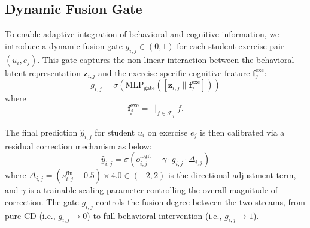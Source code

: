 \documentclass[a4paper,runningheads]{llncs}
\begin{document}
\subsection{Dynamic Fusion Gate}
To enable adaptive integration of behavioral and cognitive information, we introduce a dynamic fusion gate $g_{i,j} \in (0,1)$ for each student-exercise pair $(u_i, e_j)$. This gate captures the non-linear interaction between the behavioral latent representation $\bm{z}_{i,j}$ and the exercise-specific cognitive feature $\bm{f}^{\text{exe}}_j$:
\begin{equation}
    g_{i,j} = \sigma\left(\text{MLP}_{\text{gate}}\left(\left[\bm{z}_{i,j} \parallel \bm{f}^{\text{exe}}_j\right]\right)\right)
\end{equation}
where
\begin{equation}
    \bm{f}^{\text{exe}}_j = \mathop{\parallel}_{f \in \mathcal{F}_j} f.
\end{equation}

The final prediction $\hat{y}_{i,j}$ for student $u_i$ on exercise $e_j$ is then calibrated via a residual correction mechanism as below:
\begin{equation}
    \hat{y}_{i,j} = \sigma\left(o_{i,j}^{\text{logit}} + \gamma \cdot g_{i,j} \cdot \Delta_{i,j}\right)
\end{equation}
where $\Delta_{i,j} = \left(s_{i,j}^{\text{flu}} - 0.5\right) \times 4.0 \in (-2, 2)$ is the directional adjustment term, and
$\gamma$ is a trainable scaling parameter controlling the overall magnitude of correction. The gate $g_{i,j}$ controls the fusion degree between the two streams, from pure CD (i.e., $g_{i,j}\to 0$) to full behavioral intervention (i.e., $g_{i,j}\to 1$).
\end{document}
